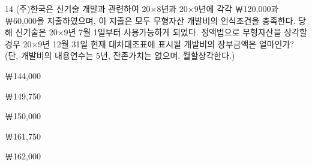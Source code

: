 \begin{question}{14}
(주)한국은 신기술 개발과 관련하여 20×8년과 20×9년에 각각 ￦120,000과 ￦60,000을 지출하였으며, 이 지출은 모두 무형자산 개발비의 인식조건을 충족한다. 당해 신기술은 20×9년 7월 1일부터 사용가능하게 되었다. 정액법으로 무형자산을 상각할 경우 20×9년 12월 31일 현재 대차대조표에 표시될 개발비의 장부금액은 얼마인가? (단, 개발비의 내용연수는 5년, 잔존가치는 없으며, 월할상각한다.)
\begin{choices}
  \item ￦144,000
  \item ￦149,750
  \item ￦150,000
  \item ￦161,750
  \item ￦162,000
\end{choices}
\end{question}
